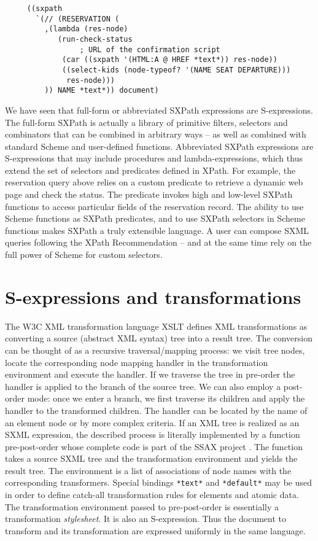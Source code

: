 \documentclass[10pt]{llncs}
\begin{document}
\begin{verbatim}
     ((sxpath
       `(// (RESERVATION (
         ,(lambda (res-node)
            (run-check-status
                 ; URL of the confirmation script
             (car ((sxpath '(HTML:A @ HREF *text*)) res-node))
             ((select-kids (node-typeof? '(NAME SEAT DEPARTURE)))
              res-node)))
         )) NAME *text*)) document)
\end{verbatim}
We have seen that full-form or abbreviated SXPath expressions are
S-expressions. The full-form SXPath is actually a library of primitive
filters, selectors and combinators that can be combined in arbitrary
ways -- as well as combined with standard Scheme and user-defined
functions. Abbreviated SXPath expressions are S-expressions that may
include procedures and lambda-expressions, which thus extend the set
of selectors and predicates defined in XPath. For example, the
reservation query above relies on a custom predicate to retrieve a
dynamic web page and check the status. The predicate invokes high and
low-level SXPath functions to access particular fields of the
reservation record. The ability to use Scheme functions as SXPath
predicates, and to use SXPath selectors in Scheme functions makes
SXPath a truly extensible language. A user can compose SXML queries
following the XPath Recommendation -- and at the same time rely on the
full power of Scheme for custom selectors.

\section{S-expressions and transformations}
The W3C XML transformation language XSLT \cite{XSLT}
defines XML transformations as converting a source (abstract XML
syntax) tree into a result tree. The conversion can be thought of as a
recursive traversal/mapping process: we visit tree nodes, locate the
corresponding node mapping handler in the transformation environment
and execute the handler. If we traverse the tree in pre-order the
handler is applied to the branch of the source tree. We can also
employ a post-order mode: once we enter a branch, we first traverse
its children and apply the handler to the transformed children. The
handler can be located by the name of an element node or by more
complex criteria. If an XML tree is realized as an SXML expression,
the described process is literally implemented by a function
pre-post-order whose complete code is part of the SSAX project \cite{SSAX}. The function takes a source SXML tree and the
transformation environment and yields the result tree. The environment
is a list of associations of node names with the corresponding
transformers. Special bindings \texttt{*text*} and \texttt{*default*} may be used in order to define catch-all transformation
rules for elements and atomic data. The transformation environment
passed to pre-post-order is essentially a transformation \emph{stylesheet}. It is also an S-expression. Thus the document to
transform and its transformation are expressed uniformly in the same
language.
\end{document}
